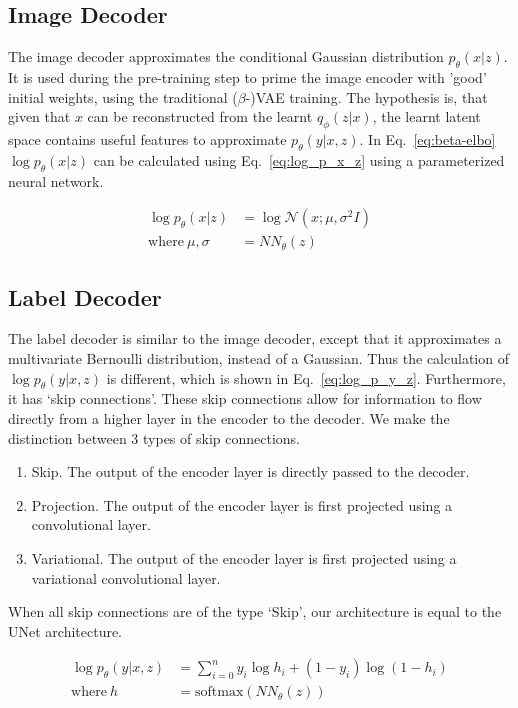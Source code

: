 \subsection{Image Decoder}
The image decoder approximates the conditional Gaussian distribution $p_\theta(x|z)$. It is used during the pre-training step to prime the image encoder with 'good' initial weights, using the traditional ($\beta$-)VAE training. The hypothesis is, that given that $x$ can be reconstructed from the learnt $q_\phi(z|x)$, the learnt latent space contains useful features to approximate $p_\theta(y|x,z)$. In Eq.~\ref{eq:beta-elbo} $\log p_\theta(x|z)$ can be calculated using Eq.~\ref{eq:log_p_x_z} using a parameterized neural network.

\begin{equation}
    \begin{split}
        \log p_\theta(x|z)      & = \log \mathcal{N}(x; \mu, \sigma^2I) \label{eq:log_p_x_z} \\
        \text{where}~\mu,\sigma & =NN_\theta(z)
    \end{split}
\end{equation}

\subsection{Label Decoder}
The label decoder is similar to the image decoder, except that it approximates a multivariate Bernoulli distribution, instead of a Gaussian. Thus the calculation of $\log p_\theta(y|x,z)$ is different, which is shown in Eq.~\ref{eq:log_p_y_z}. Furthermore, it has `skip connections'. These skip connections allow for information to flow directly from a higher layer in the encoder to the decoder. We make the distinction between 3 types of skip connections.
\begin{enumerate}
    \item Skip. The output of the encoder layer is directly passed to the decoder.
    \item Projection. The output of the encoder layer is first projected using a convolutional layer.
    \item Variational. The output of the encoder layer is first projected using a variational convolutional layer.
\end{enumerate}
When all skip connections are of the type `Skip', our architecture is equal to the UNet architecture.

\begin{subequations}
    \begin{align}
        \log p_\theta(y|x, z) & = \sum_{i=0}^n y_i \log h_i + (1 - y_i)\log(1-h_i) \label{eq:log_p_y_z} \\
        \text{where}~h        & = \text{softmax}(NN_\theta(z))
    \end{align}
\end{subequations}

